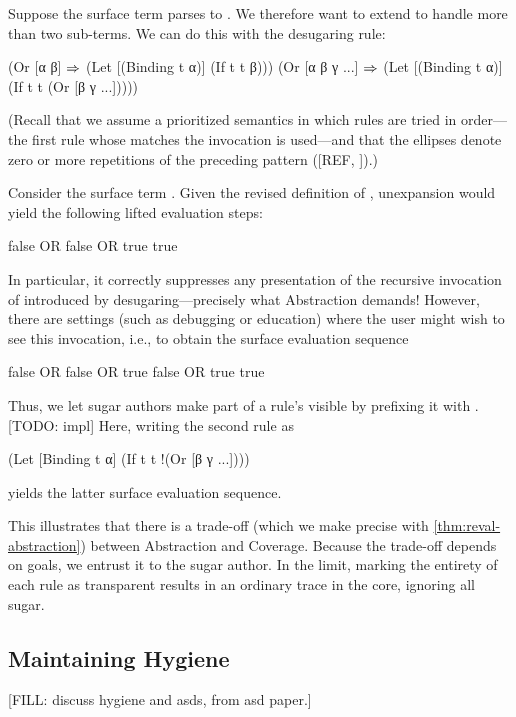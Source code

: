 Suppose the surface term  parses to
. We therefore want to extend 
to handle more than two sub-terms.  We can do this with the desugaring
rule:
\begin{Codes}
(Or [α β] \(\Rightarrow\)
  (Let [(Binding t α)]
      (If t t β)))
(Or [α β γ ...] \(\Rightarrow\)
  (Let [(Binding t α)]
      (If t t (Or [β γ ...]))))
\end{Codes}
(Recall that we assume a prioritized semantics in which rules are tried in
order---the first rule whose  matches the invocation is
used---and that the ellipses denote zero or more repetitions
of the preceding pattern ([REF, \cite{macro-by-example}]).)

Consider the surface term . 
Given the revised definition of , unexpansion would yield the
following lifted evaluation steps:
\begin{Codes}
    false OR false OR true
\SurfStep true
\end{Codes}
In particular, it correctly suppresses any presentation of the recursive
invocation of 
introduced by desugaring---precisely what Abstraction demands!
However, there are settings
(such as debugging or education) where the user might wish to see this
invocation, i.e., to obtain the surface evaluation sequence
\begin{Codes}
    false OR false OR true
\SurfStep false OR true
\SurfStep true
\end{Codes}
Thus, we let sugar authors make part of a rule's 
visible by prefixing it with \Code{!}. [TODO: impl] Here, writing the second
 rule as
\begin{Codes}
(Let [Binding t α]
    (If t t !(Or [β γ ...])))
\end{Codes}
yields the latter surface evaluation sequence.

This illustrates that there is a trade-off (which we make precise with
\cref{thm:reval-abstraction}) between Abstraction and Coverage.
Because the trade-off depends on
goals, we entrust it to the sugar author.  In the limit,
marking the entirety of each rule as transparent results in
an ordinary trace in the core, ignoring all sugar.

\subsection{Maintaining Hygiene}

[FILL: discuss hygiene and asds, from asd paper.]


